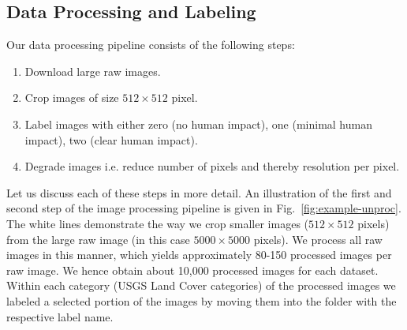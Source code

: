 \subsection{Data Processing and Labeling}
Our data processing pipeline consists of the following steps:
\begin{enumerate}
	\item Download large raw images.
	\item Crop images of size $512\times512$ pixel.
	\item Label images with either zero (no human impact), one (minimal human impact), two (clear human impact).
	\item Degrade images i.e. reduce number of pixels and thereby resolution per pixel.
\end{enumerate}

Let us discuss each of these steps in more detail. An illustration of the first and second step of the image processing pipeline is given in Fig.~\ref{fig:example-unproc}. The white lines demonstrate the way we crop smaller images ($512\times512$ pixels) from the large raw image (in this case $5000\times5000$ pixels). We process all raw images in this manner, which yields approximately 80-150 processed images per raw image. We hence obtain about 10,000 processed images for each dataset. Within each category (USGS Land Cover categories) of the processed images we labeled a selected portion of the images by moving them into the folder with the respective label name. 

